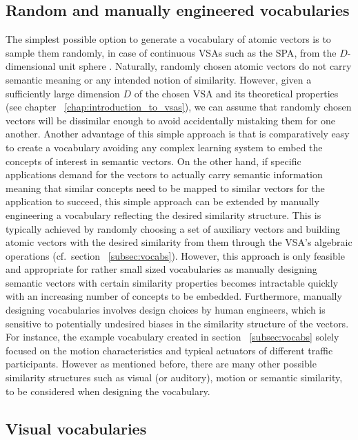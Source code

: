 \subsection{Random and manually engineered vocabularies}%
\label{subsec:basic_random_vocabularies}

The simplest possible option to generate a vocabulary of atomic vectors is to sample them randomly, in case of continuous \acp{VSA} such as the \ac{SPA}, from the $D$-dimensional unit sphere \cite{Voelker2017}.
Naturally, randomly chosen atomic vectors do not carry semantic meaning or any intended notion of similarity.
However, given a sufficiently large dimension $D$ of the chosen \ac{VSA} and its theoretical properties (see chapter ~\ref{chap:introduction_to_vsas}), we can assume that randomly chosen vectors will be dissimilar enough to avoid accidentally mistaking them for one another.
Another advantage of this simple approach is that is comparatively easy to create a vocabulary avoiding any complex learning system to embed the concepts of interest in semantic vectors.
On the other hand, if specific applications demand for the vectors to actually carry semantic information meaning that similar concepts need to be mapped to similar vectors for the application to succeed, this simple approach can be extended by manually engineering a vocabulary reflecting the desired similarity structure.
This is typically achieved by randomly choosing a set of auxiliary vectors and building atomic vectors with the desired similarity from them through the \ac{VSA}'s algebraic operations (cf.\ section ~\ref{subsec:vocabs}).
However, this approach is only feasible and appropriate for rather small sized vocabularies as manually designing semantic vectors with certain similarity properties becomes intractable quickly with an increasing number of concepts to be embedded.
Furthermore, manually designing vocabularies involves design choices by human engineers, which is sensitive to potentially undesired biases in the similarity structure of the vectors.
For instance, the example vocabulary created in section ~\ref{subsec:vocabs} solely focused on the motion characteristics and typical actuators of different traffic participants.
However as mentioned before, there are many other possible similarity structures such as visual (or auditory), motion or semantic similarity, to be considered when designing the vocabulary.

\subsection{Visual vocabularies}%
\label{subsec:visual_vocabularies}

